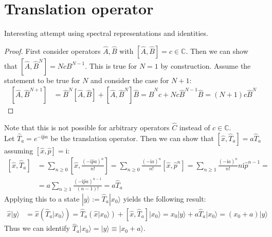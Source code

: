 \documentclass[english, parskip=full]{scrartcl}
\newcommand{\kla}{}
\newcommand{\klam}{}
\newcommand{\Ket}{}
\def\I{\text{i}}
\begin{document}
\section{Translation operator}
Interesting attempt using spectral representations and identities.
\begin{proof}
First consider operators $\hat{A},\hat{B}$ with $\klam\left[ {\hat{A},\hat{B}} \right]=c\in\mathbb{C}$. Then we can show that $\klam\left[ {\hat{A},\hat{B}^N} \right]=NcB^{N-1}$. This is true for $N=1$ by construction. Assume the statement to be true for $N$ and consider the case for $N+1$:
\begin{align*}
\klam\left[ {\hat{A},\hat{B}^{N+1}} \right]&=\hat{B}^N\klam\left[ {\hat{A},\hat{B}} \right]+\klam\left[ {\hat{A},\hat{B}^N} \right]\hat{B}=\hat{B}^Nc+Nc\hat{B}^{N-1}\hat{B}=(N+1)c\hat{B}^N
\end{align*}
\end{proof}
Note that this is not possible for arbitrary operators $\hat{C}$ instead of $c\in\mathbb{C}$.\\
Let $\hat{T}_a=e^{-\I \hat{p}a}$ be the translation operator. Then we can show that $\klam\left[ {\hat{x},\hat{T}_a} \right]=a\hat{T}_a$ assuming $\klam\left[ {\hat{x},\hat{p}} \right]=\I$:
\begin{align*}
\klam\left[ {\hat{x},\hat{T}_a} \right]&=\sum_{n\ge 0}\klam\left[ {\hat{x},\frac{(-\I \hat{p}a)^n}{n!}} \right]=\sum_{n\ge 0}\frac{(-\I a)^n}{n!}\klam\left[ {\hat{x},\hat{p}^n} \right]=\sum_{n\ge 1}\frac{(-\I a)^n}{n!}n\I\hat{p}^{n-1}=\\
&=a\sum_{n\ge 1}\frac{(-\I \hat{p}a)^{n-1}}{(n-1)!}=a\hat{T}_a
\end{align*}
Applying this to a state $\Ket | {y} \rangle:=\hat{T}_a\Ket | {x_0} \rangle$ yields the following result:
\begin{align*}
\hat{x}\Ket | {y} \rangle&=\hat{x}\kla\left( {\hat{T}_a\Ket | {x_0} \rangle} \right)=\hat{T}_a\kla\left( {\hat{x}\Ket | {x_0} \rangle} \right)+\klam\left[ {\hat{x},\hat{T}_a} \right]\Ket | {x_0} \rangle=x_0\Ket | {y} \rangle+a\hat{T}_a\Ket | {x_0} \rangle=(x_0+a)\Ket | {y} \rangle
\end{align*}
Thus we can identify $\hat{T}_a\Ket | {x_0} \rangle=\Ket | {y} \rangle\equiv\Ket | {x_0+a} \rangle$.
\end{document}
